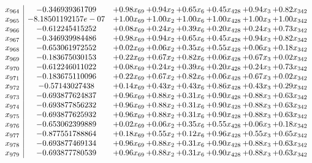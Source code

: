 \documentclass[8pt]{article}
\begin{document}
\[\begin{array}{c| c c@{\hskip 2pt} c@{\hskip 2pt} c@{\hskip 2pt} c@{\hskip 2pt} c@{\hskip 2pt} c@{\hskip 2pt} }
 x_{964}   &  -0.346939361709 & +  0.98 x_{69} & +  0.94 x_{2} & +  0.65 x_{6} & +  0.45 x_{428} & +  0.94 x_{3} & +  0.82 x_{342}\\
 x_{965}   &  -8.18501192157e-07 & +  1.00 x_{69} & +  1.00 x_{2} & +  1.00 x_{6} & +  1.00 x_{428} & +  1.00 x_{3} & +  1.00 x_{342}\\
 x_{966}   &  -0.612245415252 & +  0.08 x_{69} & +  0.24 x_{2} & +  0.39 x_{6} & +  0.20 x_{428} & +  0.24 x_{3} & +  0.73 x_{342}\\
 x_{967}   &  -0.346939984486 & +  0.98 x_{69} & +  0.94 x_{2} & +  0.65 x_{6} & +  0.45 x_{428} & +  0.94 x_{3} & +  0.82 x_{342}\\
 x_{968}   &  -0.653061972552 & +  0.02 x_{69} & +  0.06 x_{2} & +  0.35 x_{6} & +  0.55 x_{428} & +  0.06 x_{3} & +  0.18 x_{342}\\
 x_{969}   &  -0.183675030153 & +  0.22 x_{69} & +  0.67 x_{2} & +  0.82 x_{6} & +  0.06 x_{428} & +  0.67 x_{3} & +  0.02 x_{342}\\
 x_{970}   &  -0.612246011022 & +  0.08 x_{69} & +  0.24 x_{2} & +  0.39 x_{6} & +  0.20 x_{428} & +  0.24 x_{3} & +  0.73 x_{342}\\
 x_{971}   &  -0.183675110096 & +  0.22 x_{69} & +  0.67 x_{2} & +  0.82 x_{6} & +  0.06 x_{428} & +  0.67 x_{3} & +  0.02 x_{342}\\
 x_{972}   &  -0.57143027438 & +  0.14 x_{69} & +  0.43 x_{2} & +  0.43 x_{6} & +  0.86 x_{428} & +  0.43 x_{3} & +  0.29 x_{342}\\
 x_{973}   &  -0.693877624837 & +  0.96 x_{69} & +  0.88 x_{2} & +  0.31 x_{6} & +  0.90 x_{428} & +  0.88 x_{3} & +  0.63 x_{342}\\
 x_{974}   &  -0.693877856232 & +  0.96 x_{69} & +  0.88 x_{2} & +  0.31 x_{6} & +  0.90 x_{428} & +  0.88 x_{3} & +  0.63 x_{342}\\
 x_{975}   &  -0.693877625932 & +  0.96 x_{69} & +  0.88 x_{2} & +  0.31 x_{6} & +  0.90 x_{428} & +  0.88 x_{3} & +  0.63 x_{342}\\
 x_{976}   &  -0.653062399889 & +  0.02 x_{69} & +  0.06 x_{2} & +  0.35 x_{6} & +  0.55 x_{428} & +  0.06 x_{3} & +  0.18 x_{342}\\
 x_{977}   &  -0.877551788864 & +  0.18 x_{69} & +  0.55 x_{2} & +  0.12 x_{6} & +  0.96 x_{428} & +  0.55 x_{3} & +  0.65 x_{342}\\
 x_{978}   &  -0.693877469134 & +  0.96 x_{69} & +  0.88 x_{2} & +  0.31 x_{6} & +  0.90 x_{428} & +  0.88 x_{3} & +  0.63 x_{342}\\
 x_{979}   &  -0.693877780539 & +  0.96 x_{69} & +  0.88 x_{2} & +  0.31 x_{6} & +  0.90 x_{428} & +  0.88 x_{3} & +  0.63 x_{342}\\

\end{array}\]
\end{document}
